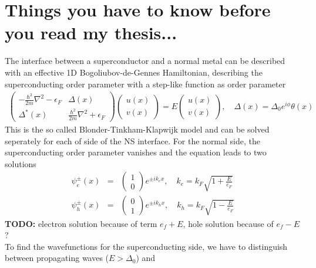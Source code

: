 \chapter{Things you have to know before you read my thesis...}
\label{ch:basics}

The interface between a superconductor and a normal metal can be described with an effective 1D Bogoliubov-de-Gennes Hamiltonian, describing the superconducting order parameter with a step-like function as order parameter
\begin{eqnarray}
\begin{pmatrix}
-\frac{\hbar^2}{2m} \nabla^2 - \epsilon_F & \Delta(x) \\
\Delta^*(x) & \frac{\hbar^2}{2m} \nabla^2 + \epsilon_F 
\end{pmatrix}
\begin{pmatrix}
u(x) \\
v(x)
\end{pmatrix} = E 
\begin{pmatrix}
u(x)\\
v(x)
\end{pmatrix}, \quad \Delta(x) = \Delta_0 e^{i \phi} \theta(x)
\end{eqnarray}
This is the so called Blonder-Tinkham-Klapwijk model and can be solved seperately for each of side of the NS interface. For the normal side, the superconducting order parameter vanishes and the equation leads to two solutions
\begin{eqnarray}
\psi_e^{\pm}(x) &=& \begin{pmatrix} 1 \\ 0 \end{pmatrix} e^{\pm i k_e x}, \quad k_e = k_F \sqrt{1 + \frac{E}{e_F}}\\ 
\psi_h^{\pm}(x) &=& \begin{pmatrix} 0 \\ 1 \end{pmatrix} e^{\pm i k_h x}, \quad k_h =  k_F \sqrt{1 - \frac{E}{e_F}}
\end{eqnarray}
\textbf{TODO:} electron solution because of term $e_f + E$, hole solution because of $e_f - E$ ? \\
To find the wavefunctions for the superconducting side, we have to distinguish between propagating waves ($E > \Delta_0$) and 
